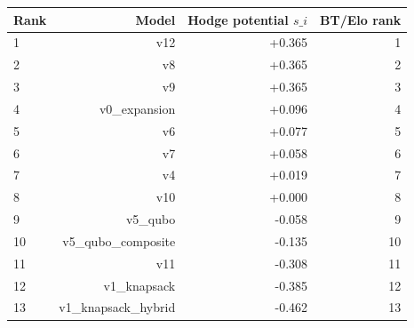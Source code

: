 \begin{tabular}{lrrr}
\toprule
Rank & Model & Hodge potential $s\_i$ & BT/Elo rank \\
\midrule
1 & v12 & +0.365 & 1 \\
2 & v8 & +0.365 & 2 \\
3 & v9 & +0.365 & 3 \\
4 & v0\_expansion & +0.096 & 4 \\
5 & v6 & +0.077 & 5 \\
6 & v7 & +0.058 & 6 \\
7 & v4 & +0.019 & 7 \\
8 & v10 & +0.000 & 8 \\
9 & v5\_qubo & -0.058 & 9 \\
10 & v5\_qubo\_composite & -0.135 & 10 \\
11 & v11 & -0.308 & 11 \\
12 & v1\_knapsack & -0.385 & 12 \\
13 & v1\_knapsack\_hybrid & -0.462 & 13 \\
\bottomrule
\end{tabular}
